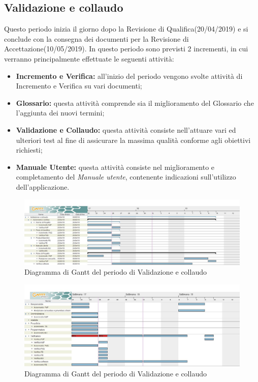 \newpage
\subsection{Validazione e collaudo}
Questo periodo inizia il giorno dopo la  Revisione di Qualifica(20/04/2019) e si conclude con la consegna dei documenti per la  Revisione di Accettazione(10/05/2019). \newline
In questo periodo sono previsti 2 incrementi, in cui verranno principalmente effettuate le seguenti attività: 
\begin{itemize}
	\item{\textbf{Incremento e Verifica:} all’inizio del periodo vengono svolte attività di Incremento e Verifica su vari documenti;}
	\item{\textbf{Glossario:} questa attività comprende sia il miglioramento del Glossario che l’aggiunta dei nuovi termini;}
	\item{\textbf{Validazione e Collaudo:} questa attività consiste nell'attuare vari ed ulteriori test al fine di assicurare la massima qualità conforme agli obiettivi richiesti;}
	\item{\textbf{Manuale Utente:} questa attività consiste nel miglioramento e completamento del \textit{Manuale utente}, contenente indicazioni sull’utilizzo dell’applicazione.}
\end{itemize}

\clearpage
\begin{figure}[!htpb]
	\centering
	\includegraphics[width=\textwidth]{gantcollaudo.jpg}
	\caption{Diagramma di Gantt del periodo di Validazione e collaudo}
\end{figure}

\begin{figure}[!htpb]
	\centering
	\includegraphics[width=\textwidth]{gantcollaudorisorse.jpg}
	\caption{Diagramma di Gantt del periodo di Validazione e collaudo}
\end{figure}

